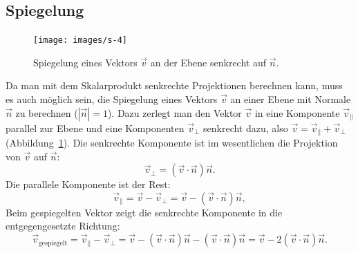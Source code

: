 \subsection{Spiegelung\label{spiegelung}}
\begin{figure}
\begin{center}
\texttt{[image: images/s-4]}
\end{center}
\caption{Spiegelung eines Vektors $\vec v$ an der Ebene senkrecht auf $\vec n$.
\label{image-spiegelung}}
\end{figure}
Da man mit dem Skalarprodukt senkrechte Projektionen berechnen kann,
muss es auch möglich sein, die Spiegelung eines Vektors $\vec v$
an einer Ebene mit Normale $\vec n$ zu berechnen ($|\vec n|=1$).
Dazu zerlegt man den Vektor $\vec v$ in eine Komponente $\vec v_{\|}$
parallel zur Ebene und eine Komponenten $\vec v_{\perp}$ senkrecht dazu,
also $\vec v=\vec v_{\|}+\vec v_{\perp}$ (Abbildung~\ref{image-spiegelung}).
Die senkrechte Komponente
ist im wesentlichen die Projektion von $\vec v$ auf $\vec n$:
\[
\vec v_{\perp}=
(\vec v\cdot\vec n)\vec n
.
\]
Die parallele Komponente ist der Rest:
\[
\vec v_{\|}=\vec v -\vec v_{\perp}=
\vec v-(\vec v\cdot\vec n)\vec n
,
\]
Beim gespiegelten Vektor zeigt die senkrechte Komponente in die
entgegengesetzte Richtung:
\begin{equation}
\vec v_{\text{gespiegelt}}=
\vec v_{\|}-\vec v_{\perp}
=
\vec v-(\vec v\cdot\vec n)\vec n
-
(\vec v\cdot\vec n)\vec n
=\vec v-2(\vec v\cdot\vec n)\vec n.
\label{equation:spiegelung}
\end{equation}

